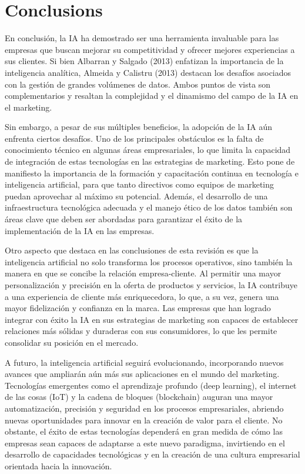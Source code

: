 \documentclass[9pt]{article}
\begin{document}
\newpage
\section*{Conclusions}

En conclusión, la IA ha demostrado ser una herramienta invaluable para las empresas que buscan mejorar su competitividad y ofrecer mejores experiencias a sus clientes. Si bien Albarran y Salgado (2013) enfatizan la importancia de la inteligencia analítica, Almeida y Calistru (2013) destacan los desafíos asociados con la gestión de grandes volúmenes de datos. Ambos puntos de vista son complementarios y resaltan la complejidad y el dinamismo del campo de la IA en el marketing.
\cite{albarran2013inteligencia}
\cite{almeida2013main}

Sin embargo, a pesar de sus múltiples beneficios, la adopción de la IA aún enfrenta ciertos desafíos. Uno de los principales obstáculos es la falta de conocimiento técnico en algunas áreas empresariales, lo que limita la capacidad de integración de estas tecnologías en las estrategias de marketing. Esto pone de manifiesto la importancia de la formación y capacitación continua en tecnología e inteligencia artificial, para que tanto directivos como equipos de marketing puedan aprovechar al máximo su potencial. Además, el desarrollo de una infraestructura tecnológica adecuada y el manejo ético de los datos también son áreas clave que deben ser abordadas para garantizar el éxito de la implementación de la IA en las empresas.

Otro aspecto que destaca en las conclusiones de esta revisión es que la inteligencia artificial no solo transforma los procesos operativos, sino también la manera en que se concibe la relación empresa-cliente. Al permitir una mayor personalización y precisión en la oferta de productos y servicios, la IA contribuye a una experiencia de cliente más enriquecedora, lo que, a su vez, genera una mayor fidelización y confianza en la marca. Las empresas que han logrado integrar con éxito la IA en sus estrategias de marketing son capaces de establecer relaciones más sólidas y duraderas con sus consumidores, lo que les permite consolidar su posición en el mercado.

A futuro, la inteligencia artificial seguirá evolucionando, incorporando nuevos avances que ampliarán aún más sus aplicaciones en el mundo del marketing. Tecnologías emergentes como el aprendizaje profundo (deep learning), el internet de las cosas (IoT) y la cadena de bloques (blockchain) auguran una mayor automatización, precisión y seguridad en los procesos empresariales, abriendo nuevas oportunidades para innovar en la creación de valor para el cliente. No obstante, el éxito de estas tecnologías dependerá en gran medida de cómo las empresas sean capaces de adaptarse a este nuevo paradigma, invirtiendo en el desarrollo de capacidades tecnológicas y en la creación de una cultura empresarial orientada hacia la innovación.
\end{document}
